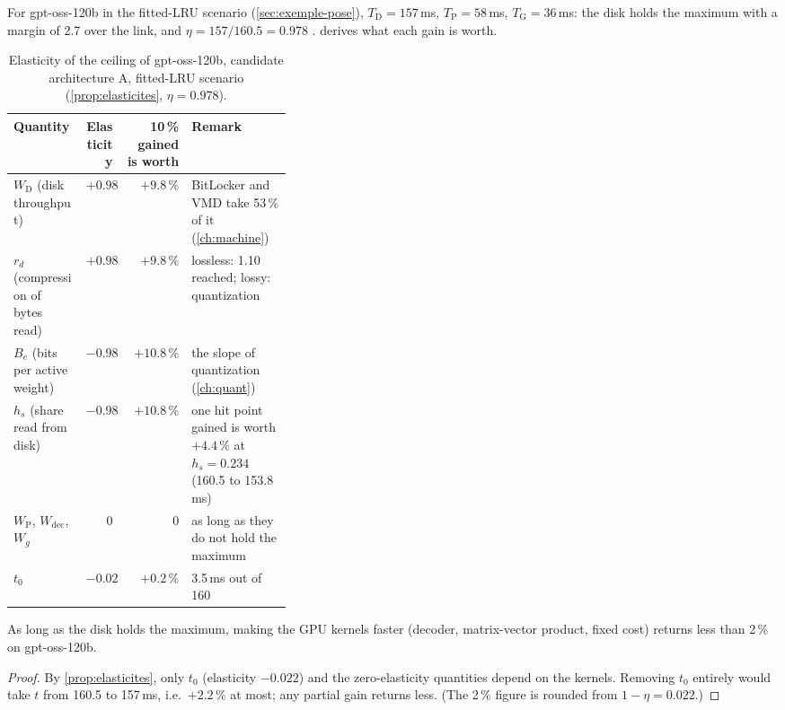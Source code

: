 For gpt-oss-120b in the fitted-LRU scenario (\cref{sec:exemple-pose}), $T_{\mathrm{D}} = 157$\,ms, $T_{\mathrm{P}} = 58$\,ms, $T_{\mathrm{G}} = 36$\,ms: the disk holds the maximum with a margin of 2.7 over the link, and $\eta = 157/160.5 = 0.978$ \calc.  derives what each gain is worth.

\begin{table}[ht]
\centering\small
\caption[What each quantity is worth]{Elasticity of the ceiling of gpt-oss-120b, candidate architecture A, fitted-LRU scenario \calc{} (\cref{prop:elasticites}, $\eta = 0.978$).}
\label{tab:elasticites}
\begin{tabular}{@{}lrrp{0.36\linewidth}@{}}
\toprule
Quantity & Elasticity & 10\,\% gained is worth & Remark \\
\midrule
$W_{\mathrm{D}}$ (disk throughput) & $+0.98$ & $+9.8\,\%$ & BitLocker and VMD take 53\,\% of it (\cref{ch:machine}) \\
$r_d$ (compression of bytes read) & $+0.98$ & $+9.8\,\%$ & lossless: 1.10 reached; lossy: quantization \\
$B_e$ (bits per active weight) & $-0.98$ & $+10.8\,\%$ & the slope of quantization (\cref{ch:quant}) \\
$h_s$ (share read from disk) & $-0.98$ & $+10.8\,\%$ & one hit point gained is worth $+4.4\,\%$ at $h_s = 0.234$ (160.5 to 153.8\,ms) \\
$W_{\mathrm{P}}$, $W_{\mathrm{dec}}$, $W_g$ & 0 & 0 & as long as they do not hold the maximum \\
$t_0$ & $-0.02$ & $+0.2\,\%$ & 3.5\,ms out of 160 \\
\bottomrule
\end{tabular}
\end{table}

\begin{corollaire}\label{cor:ornement}
As long as the disk holds the maximum, making the GPU kernels faster (decoder, matrix-vector product, fixed cost) returns less than 2\,\% on gpt-oss-120b.
\end{corollaire}

\begin{proof}
By \cref{prop:elasticites}, only $t_0$ (elasticity $-0.022$) and the zero-elasticity quantities depend on the kernels. Removing $t_0$ entirely would take $t$ from 160.5 to 157\,ms, i.e.\ $+2.2\,\%$ at most; any partial gain returns less. (The 2\,\% figure is rounded from $1 - \eta = 0.022$.)
\end{proof}

